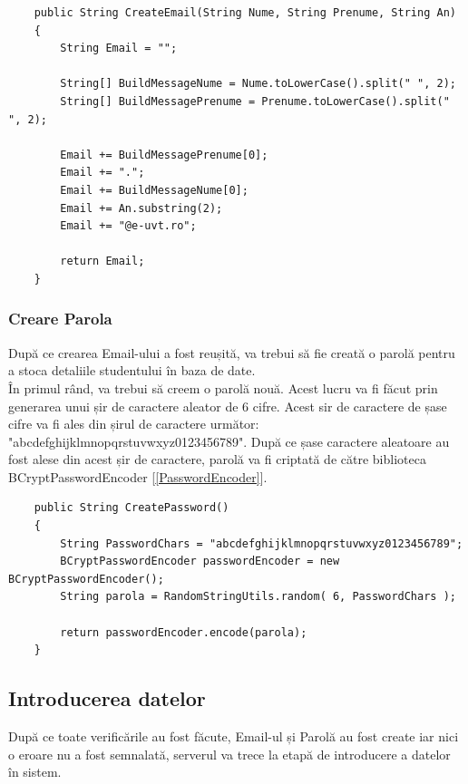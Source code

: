 \documentclass{article}
\begin{document}
	\begin{verbatim}
    public String CreateEmail(String Nume, String Prenume, String An)
    {
        String Email = "";

        String[] BuildMessageNume = Nume.toLowerCase().split(" ", 2);
        String[] BuildMessagePrenume = Prenume.toLowerCase().split(" ", 2);

        Email += BuildMessagePrenume[0];
        Email += ".";
        Email += BuildMessageNume[0];
        Email += An.substring(2);
        Email += "@e-uvt.ro";

        return Email;
    }
	\end{verbatim}

		\subsubsection*{Creare Parola}
		
		După ce crearea Email-ului a fost reușită, va trebui să fie creată o parolă pentru a stoca detaliile studentului în baza de date. \\

		În primul rând, va trebui să creem o parolă nouă. Acest lucru va fi făcut prin generarea unui șir de caractere aleator de 6 cifre. Acest sir de caractere de șase cifre va fi ales din șirul de caractere următor: "abcdefghijklmnopqrstuvwxyz0123456789". După ce șase caractere aleatoare au fost alese din acest șir de caractere, parolă va fi criptată de către biblioteca BCryptPasswordEncoder [\ref{PasswordEncoder}]. 
		
	\begin{verbatim}
    public String CreatePassword()
    {
        String PasswordChars = "abcdefghijklmnopqrstuvwxyz0123456789";
        BCryptPasswordEncoder passwordEncoder = new BCryptPasswordEncoder();
        String parola = RandomStringUtils.random( 6, PasswordChars );

        return passwordEncoder.encode(parola);
    }
	\end{verbatim}

		\subsection*{Introducerea datelor}
		După ce toate verificările au fost făcute, Email-ul și Parolă au fost create iar nici o eroare nu a fost semnalată, serverul va trece la etapă de introducere a datelor în sistem.\\
\end{document}
